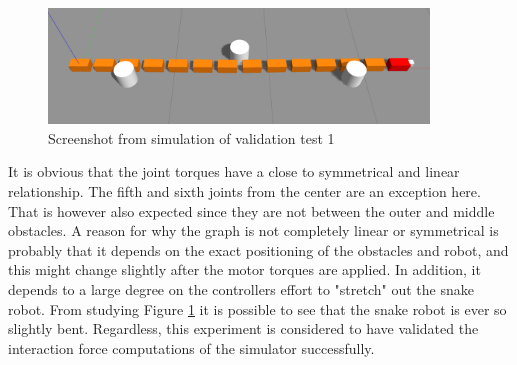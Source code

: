 \begin{figure}
    \centering
    \includegraphics[width=0.9\textwidth]{figures/experiments/exp_valid1_gazebo.png}
    \caption{Screenshot from simulation of validation test 1}
    \label{fig:valid1_gazebo}
\end{figure}

It is obvious that the joint torques have a close to symmetrical and linear relationship. The fifth and sixth joints from the center are an exception here. That is however also expected since they are not between the outer and middle obstacles. A reason for why the graph is not completely linear or symmetrical is probably that it depends on the exact positioning of the obstacles and robot, and this might change slightly after the motor torques are applied. In addition, it depends to a large degree on the controllers effort to "stretch" out the snake robot. From studying Figure \ref{fig:valid1_gazebo} it is possible to see that the snake robot is ever so slightly bent.
Regardless, this experiment is considered to have validated the interaction force computations of the simulator successfully. 